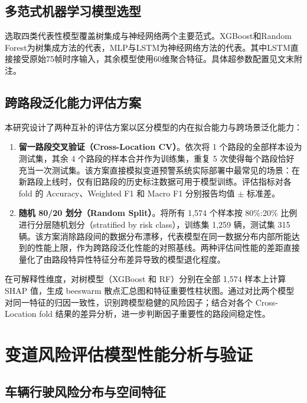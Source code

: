 \documentclass[preprint,review,12pt,a4paper]{elsarticle}
\begin{document}
\subsection{多范式机器学习模型选型}

选取四类代表性模型覆盖树集成与神经网络两个主要范式。XGBoost\cite{C19}和Random Forest\cite{C20}为树集成方法的代表，MLP与LSTM\cite{C25}为神经网络方法的代表。其中LSTM直接接受原始75帧时序输入，其余模型使用60维聚合特征。具体超参数配置见文末附注。

\subsection{跨路段泛化能力评估方案}

本研究设计了两种互补的评估方案以区分模型的内在拟合能力与跨场景泛化能力：

\begin{enumerate}
  \item \textbf{留一路段交叉验证（Cross-Location CV）}。依次将 1 个路段的全部样本设为测试集，其余 4 个路段的样本合并作为训练集，重复 5 次使得每个路段恰好充当一次测试集。该方案直接模拟变道预警系统实际部署中最常见的场景：在新路段上线时，仅有旧路段的历史标注数据可用于模型训练。评估指标对各 fold 的 Accuracy、Weighted F1 和 Macro F1 分别报告均值 $\pm$ 标准差。

  \item \textbf{随机 80/20 划分（Random Split）}。将所有 1,574 个样本按 80\%:20\% 比例进行分层随机划分（stratified by risk class），训练集 1,259 辆，测试集 315 辆。该方案消除路段间的数据分布漂移，代表模型在同一数据分布内部所能达到的性能上限，作为跨路段泛化性能的对照基线。两种评估间性能的差距直接量化了由路段特异性特征分布差异导致的模型退化程度。
\end{enumerate}

在可解释性维度，对树模型（XGBoost 和 RF）分别在全部 1,574 样本上计算 SHAP 值，生成 beeswarm 散点汇总图和特征重要性柱状图。通过对比两个模型对同一特征的归因一致性，识别跨模型稳健的风险因子；结合对各个 Cross-Location fold 结果的差异分析，进一步判断因子重要性的路段间稳定性。

\section{变道风险评估模型性能分析与验证}

\subsection{车辆行驶风险分布与空间特征}
\end{document}

